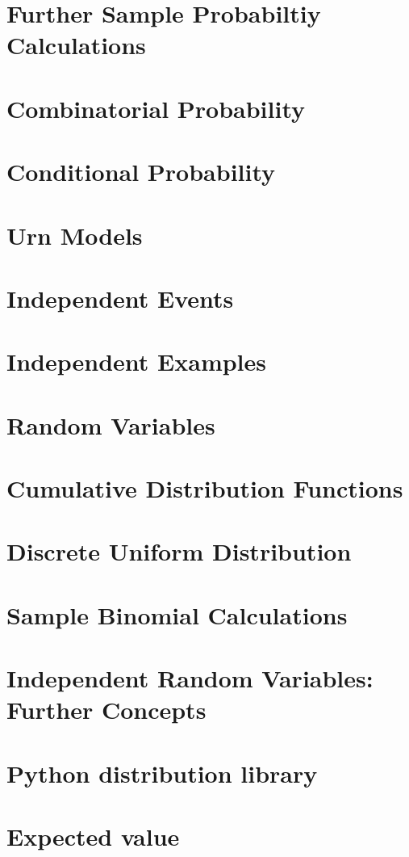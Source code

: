 \documentclass[11pt]{article}
\begin{document}
    \section{Further Sample Probabiltiy Calculations}
    \section{Combinatorial Probability}
    \section{Conditional Probability}
    \section{Urn Models}
    \section{Independent Events}
    \section{Independent Examples}
    \section{Random Variables}
    \section{Cumulative Distribution Functions}
    \section{Discrete Uniform Distribution}
    \section{Sample Binomial Calculations}
    \section{Independent Random Variables: Further Concepts}
    \section{Python distribution library}
    \section{Expected value}
\end{document}
